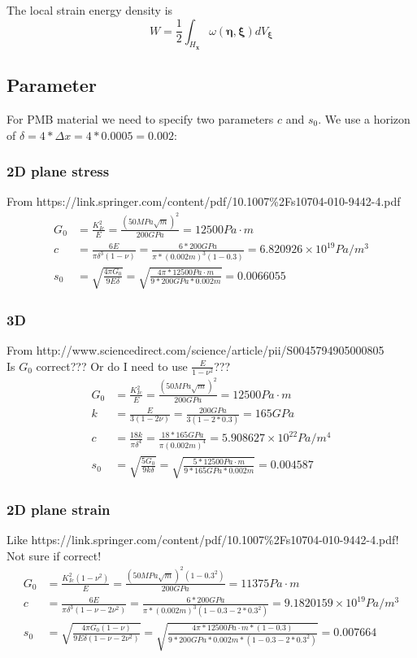 The local strain energy density is
\begin{equation}
W = \frac{1}{2}\int_{H_{\bm{x}}} \omega(\bm{\eta},\bm{\xi})dV_{\bm{\xi}}
\end{equation}



\newpage
\subsection{Parameter}
For PMB material we need to specify two parameters $c$ and $s_0$.
We use a horizon of  $\delta = 4*\Delta x=4*0.0005=0.002$:
\subsubsection{2D plane stress}
From https://link.springer.com/content/pdf/10.1007\%2Fs10704-010-9442-4.pdf
\begin{align}
G_0 &= \frac{K_{Ic}^2}{E}=\frac{(50MPa\sqrt{m})^2}{200GPa}=12500Pa\cdot m\\
c&=\frac{6E}{\pi \delta^3(1-\nu)}=\frac{6*200GPa}{\pi *(0.002m)^3(1-0.3)}=6.820926\times10^{19} Pa/m^3\\
s_0&=\sqrt{\frac{4\pi G_0}{9E\delta}}=\sqrt{\frac{4\pi*12500Pa\cdot m}{9*200GPa*0.002m}}=0.0066055
\end{align}

\subsubsection{3D}
From http://www.sciencedirect.com/science/article/pii/S0045794905000805\\
Is $G_0$ correct??? Or do I need to use $\frac{E}{1-\nu^2}$???
\begin{align}
G_0 &= \frac{K_{Ic}^2}{E}=\frac{(50MPa\sqrt{m})^2}{200GPa}=12500Pa\cdot m\\
k &= \frac{E}{3(1-2\nu)}=\frac{200GPa}{3(1-2*0.3)}=165GPa\\
c&=\frac{18k}{\pi \delta^4}=\frac{18*165GPa}{\pi (0.002m)^4}=5.908627\times10^{22}Pa/m^4\\
s_0&=\sqrt{\frac{5G_0}{9k\delta}}=\sqrt{\frac{5*12500Pa\cdot m}{9*165GPa*0.002m}}=0.004587
\end{align}

\subsubsection{2D plane strain}
Like https://link.springer.com/content/pdf/10.1007\%2Fs10704-010-9442-4.pdf!
Not sure if correct!
\begin{align}
G_0 &= \frac{K_{Ic}^2(1-\nu^2)}{E}=\frac{(50MPa\sqrt{m})^2(1-0.3^2)}{200GPa}=11375Pa\cdot m\\
c&=\frac{6E}{\pi \delta^3(1-\nu-2\nu^2)}=\frac{6*200GPa}{\pi *(0.002m)^3(1-0.3-2*0.3^2)}=9.1820159\times10^{19} Pa/m^3\\
s_0&=\sqrt{\frac{4\pi G_0(1-\nu)}{9E\delta(1-\nu-2\nu^2)}}=\sqrt{\frac{4\pi*12500Pa\cdot m*(1-0.3)}{9*200GPa*0.002m*(1-0.3-2*0.3^2)}}=0.007664
\end{align}


